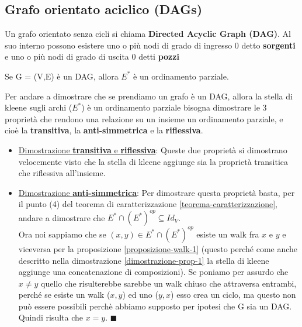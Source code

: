 \subsection{Grafo orientato aciclico (DAGs)}
\begin{definition}
    Un grafo orientato senza cicli si chiama \textbf{Directed Acyclic Graph (DAG)}. Al suo interno possono esistere uno o più nodi di grado di ingresso 0 detto \textbf{sorgenti} e uno o più nodi di grado di uscita 0 detti \textbf{pozzi}
\end{definition}

\begin{proposition}
    Se G = (V,E) è un DAG, allora $E^*$ è un ordinamento parziale.
\end{proposition}
\begin{demostration}
Per andare a dimostrare che se prendiamo un grafo è un DAG, allora la stella di kleene sugli archi ($E^*$) è un ordinamento parziale bisogna dimostrare le 3 proprietà che rendono una relazione su un insieme un ordinamento parziale, e cioè la \textbf{transitiva}, la \textbf{anti-simmetrica} e la \textbf{riflessiva}.
\begin{itemize}
    \item \underline{Dimostrazione \textbf{transitiva} e \textbf{riflessiva}}: Queste due proprietà si dimostrano velocemente visto che la stella di kleene aggiunge sia la proprietà transitica che riflessiva all'insieme.
    \item \underline{Dimostrazione \textbf{anti-simmetrica}}: Per dimostrare questa proprietà basta, per il punto (4) del teorema di caratterizzazione \ref{teorema-caratterizzazione}, andare a dimostrare che $E^* \cap (E^*)^{op} \subseteq Id_V$.\\
    Ora noi sappiamo che se $(x,y) \in E^* \cap (E^*)^{op}$ esiste un walk fra $x$ e $y$ e viceversa per la proposizione \ref{proposizione-walk-1} (questo perché come anche descritto nella dimostrazione \ref{dimostrazione-prop-1} la stella di kleene aggiunge una concatenazione di composizioni). Se poniamo per assurdo che $x \neq y$ quello che risulterebbe sarebbe un walk chiuso che attraversa entrambi, perché se esiste un walk ($x,y$) ed uno ($y, x$) esso crea un ciclo, ma questo non può essere possibili perchè abbiamo supposto per ipotesi che G sia un DAG. Quindi risulta che $x = y$. $\blacksquare$
\end{itemize}
\end{demostration}

